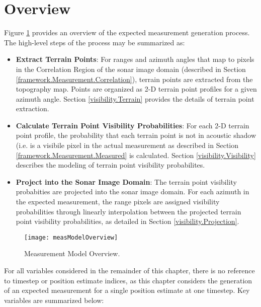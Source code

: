 \section{Overview}
\label{visibility.Overview}

Figure \ref{fig:measModelOverview} provides an overview of the expected measurement generation process.  
The high-level steps of the process may be summarized as:

\begin{itemize}
\item \textbf{Extract Terrain Points}: For ranges and azimuth angles that map to pixels in the Correlation Region of the sonar image domain (described in Section \ref{framework.Measurement.Correlation}), terrain points are extracted from the topography map.
Points are organized as 2-D terrain point profiles for a given azimuth angle. 
Section \ref{visibility.Terrain} provides the details of terrain point extraction.
\item \textbf{Calculate Terrain Point Visibility Probabilities}: For each 2-D terrain point profile, the probability that each terrain point is not in acoustic shadow (i.e. is a visibile pixel in the actual measurement as described in Section \ref{framework.Measurement.Measured} is calculated. 
Section \ref{visibility.Visibility} describes the modeling of terrain point visibility probabilites.
\item \textbf{Project into the Sonar Image Domain}: The terrain point visibility probabities are projected into the sonar image domain.  
For each azimuth in the expected measurement, the range pixels are assigned visibility probabilities through linearly interpolation between the projected terrain point visibility probabilities, as detailed in Section \ref{visibility.Projection}.

\end{itemize}

\begin{figure}[!h]
	\centering
		\texttt{[image: measModelOverview]}
	\caption{Measurement Model Overview. }
	\label{fig:measModelOverview}
\end{figure}

\noindent For all variables considered in the remainder of this chapter, there is no reference to timestep or position estimate indices, as this chapter considers the generation of an expected measurement for a single position estimate at one timestep.
Key variables are summarized below:

